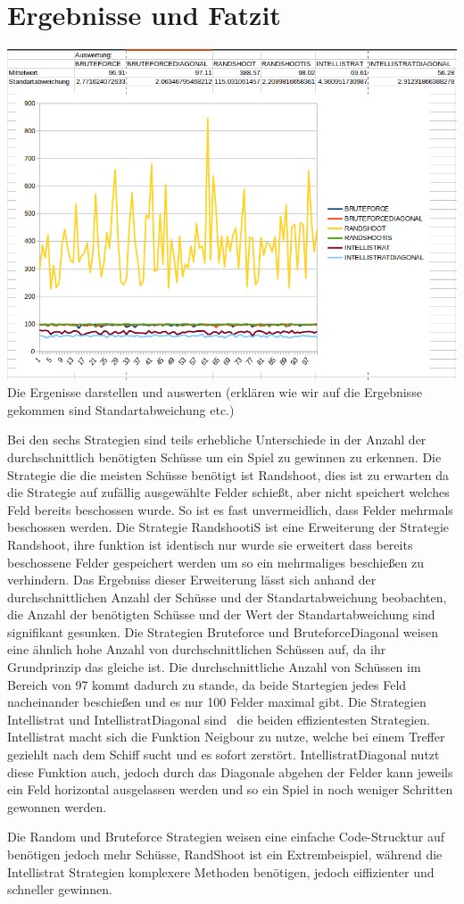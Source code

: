 \section*{Ergebnisse und Fatzit}


\includegraphics[scale=0.5]{Screenshot from 2022-02-08 08-28-03.png}
Die Ergenisse darstellen und auswerten (erklären wie wir auf die Ergebnisse gekommen sind Standartabweichung etc.)

Bei den sechs Strategien sind teils erhebliche Unterschiede in der Anzahl der durchschnittlich benötigten Schüsse um ein Spiel zu gewinnen zu erkennen. Die Strategie die die meisten 
Schüsse benötigt ist Randshoot, dies ist zu erwarten da die Strategie auf zufällig ausgewählte Felder schießt, aber nicht speichert welches Feld bereits beschossen wurde. So ist es 
fast unvermeidlich, dass Felder mehrmals beschossen werden. Die Strategie RandshootiS ist eine Erweiterung der Strategie Randshoot, ihre funktion ist identisch nur wurde sie 
erweitert dass bereits beschossene Felder gespeichert werden um so ein mehrmaliges beschießen zu verhindern. Das Ergebniss dieser Erweiterung lässt sich anhand der durchschnittlichen 
Anzahl der Schüsse und der Standartabweichung beobachten, die Anzahl der benötigten Schüsse und der Wert der Standartabweichung sind signifikant gesunken. Die Strategien Bruteforce 
und BruteforceDiagonal weisen eine ähnlich hohe Anzahl von durchschnittlichen Schüssen auf, da ihr Grundprinzip das gleiche ist. Die durchschnittliche Anzahl von Schüssen im Bereich 
von 97 kommt dadurch zu stande, da beide Startegien jedes Feld nacheinander beschießen und es nur 100 Felder maximal gibt. Die Strategien Intellistrat und IntellistratDiagonal sind \
die beiden effizientesten Strategien. Intellistrat macht sich die Funktion Neigbour zu nutze, welche bei einem Treffer geziehlt nach dem Schiff sucht und es sofort zerstört. 
IntellistratDiagonal nutzt diese Funktion auch, jedoch durch das Diagonale abgehen der Felder kann jeweils ein Feld horizontal ausgelassen werden und so ein Spiel in noch weniger 
Schritten gewonnen werden.

Die Random und Bruteforce Strategien weisen eine einfache Code-Strucktur auf benötigen jedoch mehr Schüsse, RandShoot ist ein Extrembeispiel, während die Intellistrat Strategien 
komplexere Methoden benötigen, jedoch eiffizienter und schneller gewinnen.